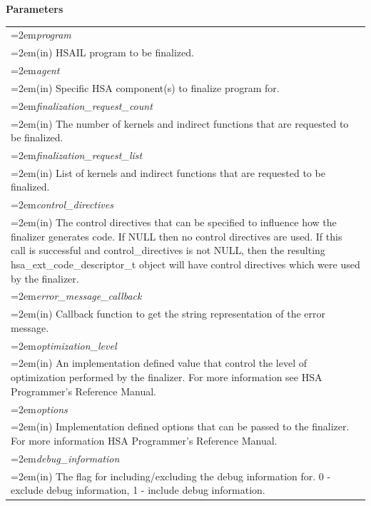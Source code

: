 \documentclass[final]{book}
\newcommand{\hsaarg}[1]{\textit{#1}}
\begin{document}
\noindent\textbf{Parameters}\\[-6mm]
\noindent\begin{longtable}{@{}>{\hangindent=2em}p{\textwidth}}
\hsaarg{program}\\\hspace{2em}(in) HSAIL program to be finalized.\\[2mm]
\hsaarg{agent}\\\hspace{2em}(in) Specific HSA component(s) to finalize program for.\\[2mm]
\hsaarg{finalization_\-request_\-count}\\\hspace{2em}(in) The number of kernels and indirect functions that are requested to be finalized.\\[2mm]
\hsaarg{finalization_\-request_\-list}\\\hspace{2em}(in) List of kernels and indirect functions that are requested to be finalized.\\[2mm]
\hsaarg{control_\-directives}\\\hspace{2em}(in) The control directives that can be specified to influence how the finalizer generates code. If NULL then no control directives are used. If this call is successful and control_\-directives is not NULL, then the resulting hsa_\-ext_\-code_\-descriptor_\-t object will have control directives which were used by the finalizer.\\[2mm]
\hsaarg{error_\-message_\-callback}\\\hspace{2em}(in) Callback function to get the string representation of the error message.\\[2mm]
\hsaarg{optimization_\-level}\\\hspace{2em}(in) An implementation defined value that control the level of optimization performed by the finalizer. For more information see HSA Programmer's Reference Manual.\\[2mm]
\hsaarg{options}\\\hspace{2em}(in) Implementation defined options that can be passed to the finalizer. For more information HSA Programmer's Reference Manual.\\[2mm]
\hsaarg{debug_\-information}\\\hspace{2em}(in) The flag for including/excluding the debug information for. 0 - exclude debug information, 1 - include debug information.
\end{longtable}
\end{document}
